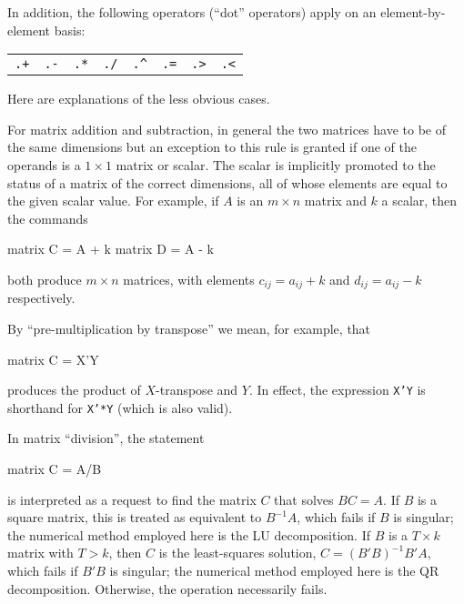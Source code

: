 In addition, the following operators (``dot'' operators) apply on an
element-by-element basis:

\begin{center}
\begin{tabular}{cccccccc}
\texttt{.+}  &  \texttt{.-}  &
\texttt{.*}  &  \texttt{./}  &  \verb+.^+  &
\texttt{.=}  &  \texttt{.>}  &  \texttt{.<} 
\end{tabular}
\end{center}

Here are explanations of the less obvious cases. 

For matrix addition and subtraction, in general the two matrices have
to be of the same dimensions but an exception to this rule is granted
if one of the operands is a $1\times 1$ matrix or scalar.  The scalar
is implicitly promoted to the status of a matrix of the correct
dimensions, all of whose elements are equal to the given scalar value.
For example, if $A$ is an $m \times n$ matrix and $k$ a scalar, then
the commands
%
\begin{code}
matrix C = A + k
matrix D = A - k
\end{code}
%
both produce $m \times n$ matrices, with elements $c_{ij} = 
a_{ij} + k$ and $d_{ij} = a_{ij} - k$ respectively.

By ``pre-multiplication by transpose'' we mean, for example, that 
%
\begin{code}
matrix C = X'Y
\end{code}
%
produces the product of $X$-transpose and $Y$.  In effect, 
the expression \texttt{X'Y} is shorthand for \texttt{X'*Y}
(which is also valid).

In matrix ``division'', the statement 
%
\begin{code}
matrix C = A/B
\end{code}
%
is interpreted as a request to find the matrix $C$ that solves $BC=A$.
If $B$ is a square matrix, this is treated as equivalent to $B^{-1}A$,
which fails if $B$ is singular; the numerical method employed here is
the LU decomposition.  If $B$ is a $T \times k$ matrix with
$T > k$, then $C$ is the least-squares solution, $C = (B'B)^{-1}B'A$,
which fails if $B'B$ is singular; the numerical method employed here is
the QR decomposition.  Otherwise, the operation necessarily fails.

